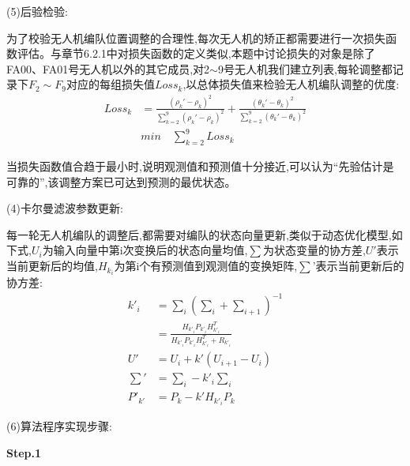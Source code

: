 \documentclass[withoutpreface,bwprint]{cumcmthesis} %
\begin{document}
    					(5)后验检验:
    					
    					为了校验无人机编队位置调整的合理性,每次无人机的矫正都需要进行一次损失函数评估。与章节6.2.1中对损失函数的定义类似,本题中讨论损失的对象是除了FA00、FA01号无人机以外的其它成员,对2$\sim$9号无人机我们建立列表,每轮调整都记录下$F_{2} \sim F_{9}$对应的每组损失值$Loss_{k}$,以总体损失值来检验无人机编队调整的优度:
    					\begin{equation}
    						\tag{6-3-6}
    						\begin{split}
    								Loss_{k} & = \frac{(\rho_{k}' - \rho_{k})^{2}}{\sum_{k=2}^{9}(\rho_{k}' - \rho_{k})^{2}} + \frac{(\theta_{k}' - \theta_{k})^{2}}{\sum_{k=2}^{9}(\theta_{k}' - \theta_{k})^{2}}  \\
    							 &min\quad\sum_{k=2}^{9}Loss_{k}
    						\end{split}
    					\end{equation}	
    				
    					当损失函数值合趋于最小时,说明观测值和预测值十分接近,可以认为“先验估计是可靠的”,该调整方案已可达到预测的最优状态。
    					
		    			(4)卡尔曼滤波参数更新:
		    						
		    				每一轮无人机编队的调整后,都需要对编队的状态向量更新,类似于动态优化模型,如下式,$U_{i}$为输入向量中第i次变换后的状态向量均值,$\sum$为状态变量的协方差,$U'$表示当前更新后的均值,$H_{k_{i}}$为第i个有预测值到观测值的变换矩阵,$\sum$'表示当前更新后的协方差:
		    					\begin{equation}
		    						\tag{6-3-7}
		    						\begin{split}
		    						k'_{i}&= \sum_{i}( \sum_{i}+ \sum_{i+1})^{-1}\\
		    						 &= \frac{H_{k'_{i}}P_{k'_{i}}H_{k'_{i}}^{T}}{H_{k'_{i}}P_{k'_{i}}H_{k'_{i}}^{T}+R_{k'_{i}}} \\
		    						U'&= U_{i}+ k'(U_{i+1}- U_{i}) \\
		    						\sum'& = \sum_{i} - k'_{i}\sum_{i} \\
		    						P'_{k'}& =P_{k}-k'H_{k'_{i}}P_{k}
		    						\end{split}
		    					\end{equation}
	    				
	    				
	    				
	    				(6)算法程序实现步骤:
	    				
	    				\noindent\textbf{Step.1}
	    				
\end{document}
